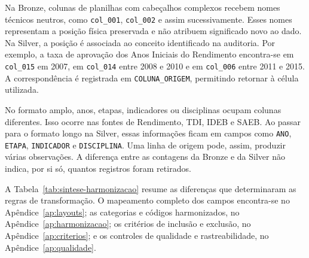 Na Bronze, colunas de planilhas com cabeçalhos complexos recebem nomes técnicos neutros, como \texttt{col\_001}, \texttt{col\_002} e assim sucessivamente. Esses nomes representam a posição física preservada e não atribuem significado novo ao dado. Na Silver, a posição é associada ao conceito identificado na auditoria. Por exemplo, a taxa de aprovação dos Anos Iniciais do Rendimento encontra-se em \texttt{col\_015} em 2007, em \texttt{col\_014} entre 2008 e 2010 e em \texttt{col\_006} entre 2011 e 2015. A correspondência é registrada em \texttt{COLUNA\_ORIGEM}, permitindo retornar à célula utilizada.

No formato amplo, anos, etapas, indicadores ou disciplinas ocupam colunas diferentes. Isso ocorre nas fontes de Rendimento, TDI, IDEB e SAEB. Ao passar para o formato longo na Silver, essas informações ficam em campos como \texttt{ANO}, \texttt{ETAPA}, \texttt{INDICADOR} e \texttt{DISCIPLINA}. Uma linha de origem pode, assim, produzir várias observações. A diferença entre as contagens da Bronze e da Silver não indica, por si só, quantos registros foram retirados.

A Tabela~\ref{tab:sintese-harmonizacao} resume as diferenças que determinaram as regras de transformação. O mapeamento completo dos campos encontra-se no Apêndice~\ref{ap:layouts}; as categorias e códigos harmonizados, no Apêndice~\ref{ap:harmonizacao}; os critérios de inclusão e exclusão, no Apêndice~\ref{ap:criterios}; e os controles de qualidade e rastreabilidade, no Apêndice~\ref{ap:qualidade}.

